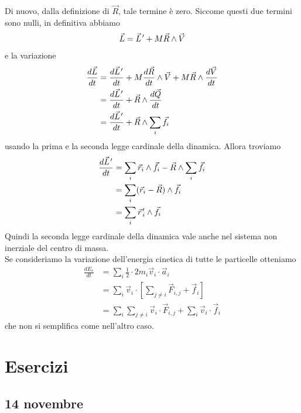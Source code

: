 \documentclass[a4paper]{article}
\begin{document}
Di nuovo, dalla definizione di \(\vec{R}\), tale termine è zero.
Siccome questi due termini sono nulli, in definitiva abbiamo
\[
    \vec{L} = \pvec{L}' + M\vec{R} \wedge \vec{V}
\]
e la variazione
\begin{align*}
    \frac{d\vec{L}}{dt} &= \frac{d\pvec{L}'}{dt} + M\frac{d\vec{R}}{dt} \wedge \vec{V}
    + M \vec{R} \wedge \frac{d\vec{V}}{dt} \\
    &= \frac{d\pvec{L}'}{dt} + \vec{R} \wedge \frac{d\vec{Q}}{dt} \\
    &= \frac{d\pvec{L}'}{dt} + \vec{R} \wedge \sum_i \vec{f}_i
\end{align*}
usando la prima e la seconda legge cardinale della dinamica.
Allora troviamo
\begin{align*}
    \frac{d\pvec{L}'}{dt} &= \sum_i \vec{r}_i \wedge \vec{f}_i
    - \vec{R} \wedge \sum_i \vec{f}_i \\
    &= \sum_i (\vec{r}_i - \vec{R}) \wedge \vec{f}_i \\
    &= \sum_i \pvec{r}_i' \wedge \vec{f}_i
\end{align*}
Quindi la seconda legge cardinale della dinamica vale anche nel sistema non inerziale
del centro di massa.
\\
Se consideriamo la variazione dell'energia cinetica di tutte le particelle otteniamo
\begin{align*}
    \frac{dE_c}{dt} &= \sum_i \frac{1}{2} \cdot 2 m_i \vec{v}_i \cdot \vec{a}_i \\
    &= \sum_i \vec{v}_i \cdot \left[
        \sum_{j\neq i} \vec{F}_{i,j} + \vec{f}_i
    \right] \\
    &= \sum_i \sum_{j\neq i} \vec{v}_i \cdot \vec{F}_{i,j} + \sum_i \vec{v}_i \cdot \vec{f}_i
\end{align*}
che non si semplifica come nell'altro caso.

\pagebreak

\section{Esercizi}

\subsection{14 novembre}
\end{document}
